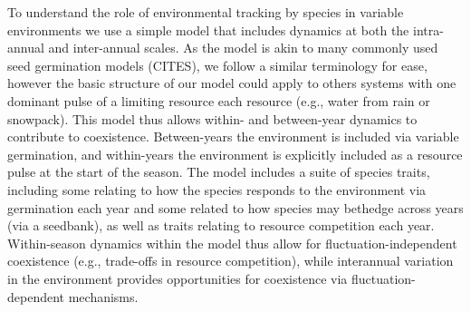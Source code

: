\documentclass[11pt,letterpaper]{article}
\begin{document}
To understand the role of environmental tracking by species in variable environments we use a simple model that includes dynamics at both the intra-annual and inter-annual scales. As the model is akin to many commonly used seed germination models (CITES), we follow a similar terminology for ease, however the basic structure of our model could apply to others systems with one dominant pulse of a limiting resource each resource (e.g., water from rain or snowpack).  This model thus allows within- and between-year dynamics to contribute to coexistence. Between-years the environment is included via variable germination, and within-years the environment is explicitly included as a resource pulse at the start of the season. The model includes a suite of species traits, including some relating to how the species responds to the environment via germination each year and some related to how species may bethedge across years (via a seedbank), as well as traits relating to resource competition each year. Within-season dynamics within the model thus allow for fluctuation-independent coexistence (e.g., trade-offs in resource competition), while interannual variation in the environment provides opportunities for coexistence via fluctuation-dependent mechanisms. \\

\end{document}
